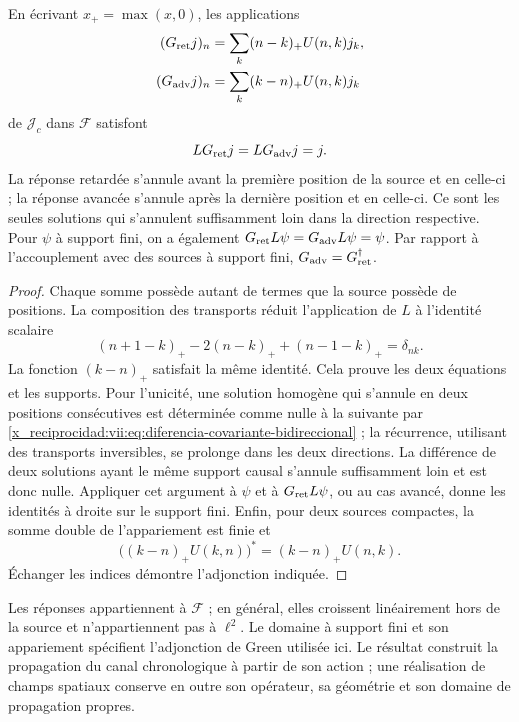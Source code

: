 \begin{theorem}
\label{x_reciprocidad:vii:thm:green-cronologico}
En écrivant \(x_+=\max(x,0)\), les applications
\begin{align}
 (G_{\rm ret}j)_n&=\sum_k(n-k)_+U(n,k)j_k,\label{x_reciprocidad:vii:eq:green-ret-cronologico}\\
 (G_{\rm adv}j)_n&=\sum_k(k-n)_+U(n,k)j_k\label{x_reciprocidad:vii:eq:green-adv-cronologico}
\end{align}
de \(\mathcal J_c\) dans \(\mathcal F\) satisfont
\[
 LG_{\rm ret}j=LG_{\rm adv}j=j.
\]
La réponse retardée s'annule avant la première position de la source et en celle-ci ; la réponse avancée s'annule après la dernière position et en celle-ci. Ce sont les seules solutions qui s'annulent suffisamment loin dans la direction respective. Pour \(\psi\) à support fini, on a également \(G_{\rm ret}L\psi=G_{\rm adv}L\psi=\psi\). Par rapport à l'accouplement avec des sources à support fini, \(G_{\rm adv}=G_{\rm ret}^{\dagger}\).
\end{theorem}
\begin{proof}
Chaque somme possède autant de termes que la source possède de positions.
La composition des transports réduit l'application de \(L\) à
l'identité scalaire
\[
 (n+1-k)_+-2(n-k)_++(n-1-k)_+=\delta_{nk}.
\]
La fonction \((k-n)_+\) satisfait la même identité. Cela prouve
les deux équations et les supports. Pour l'unicité, une solution
homogène qui s'annule en deux positions consécutives est déterminée
comme nulle à la suivante par \eqref{x_reciprocidad:vii:eq:diferencia-covariante-bidireccional} ;
la récurrence, utilisant des transports inversibles, se prolonge dans les deux
directions. La différence de deux solutions ayant le même support causal
s'annule suffisamment loin et est donc nulle.
Appliquer cet argument à \(\psi\) et à \(G_{\rm ret}L\psi\), ou au
cas avancé, donne les identités à droite sur le support fini.
Enfin, pour deux sources compactes, la somme double de l'appariement
est finie et
\[
 \bigl((k-n)_+U(k,n)\bigr)^*=(k-n)_+U(n,k).
\]
Échanger les indices démontre l'adjonction indiquée.
\end{proof}

Les réponses appartiennent à \(\mathcal F\) ; en général, elles croissent
linéairement hors de la source et n'appartiennent pas à \(\ell^2\).
Le domaine à support fini et son appariement spécifient l'adjonction
de Green utilisée ici. Le résultat construit la propagation du canal
chronologique à partir de son action ; une réalisation de champs spatiaux conserve
en outre son opérateur, sa géométrie et son domaine de propagation propres.


